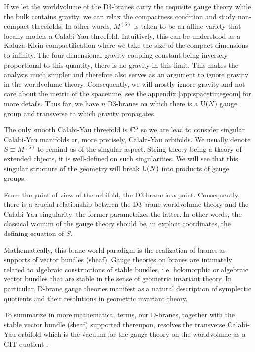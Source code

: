 \documentclass[a4paper,10pt]{article}
\begin{document}
    If we let the worldvolume of the D$3$-branes carry the requisite gauge theory while the bulk contains gravity, we can relax the compactness condition and study non-compact threefolds. In other words, $M^{(6)}$ is taken to be an affine variety that locally models a Calabi-Yau threefold. Intuitively, this can be understood as a Kaluza-Klein compactification where we take the size of the compact dimensions to infinity. The four-dimensional gravity coupling constant being inversely proportional to this quantity, there is no gravity in this limit. This makes the analysis much simpler and therefore also serves as an argument to ignore gravity in the worldvolume theory. Consequently, we will mostly ignore gravity and not care about the metric of the spacetime, see the appendix \ref{app:spacetimegeom} for more details. Thus far, we have $n$ D$3$-branes on which there is a $\text{U}(N)$ gauge group and transverse to which gravity propagates.

    The only smooth Calabi-Yau threefold is $\mathbb{C}^3$ so we are lead to consider singular Calabi-Yau manifolds or, more precisely, Calabi-Yau orbifolds. We usually denote $S\equiv M^{(6)}$ to remind us of the singular aspect. String theory being a theory of extended objects, it is well-defined on such singularities. We will see that this singular structure of the geometry will break $\text{U}(N)$ into products of gauge groups.
    
    From the point of view of the orbifold, the D$3$-brane is a point. Consequently, there is a crucial relationship between the D$3$-brane worldvolume theory and the Calabi-Yau singularity: the former parametrizes the latter. In other words, the classical vacuum of the gauge theory should be, in explicit coordinates, the defining equation of $S$.

    Mathematically, this brane-world paradigm is the realization of branes as supports of vector bundles (sheaf). Gauge theories on branes are intimately related to algebraic constructions of stable bundles, i.e. holomorphic or algebraic vector bundles that are stable in the sense of geometric invariant theory. In particular, D-brane gauge theories manifest as a natural description of symplectic quotients and their resolutions in geometric invariant theory.

    To summarize in more mathematical terms, our D-branes, together with the stable vector bundle (sheaf) supported thereupon, resolves the transverse Calabi-Yau orbifold which is the vacuum for the gauge theory on the worldvolume as a GIT quotient \marker.
\end{document}
